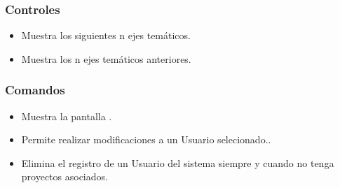 \subsubsection{Controles}
\begin{itemize}
 \item {} Muestra los siguientes n ejes temáticos.
 \item {} Muestra los n ejes temáticos anteriores.
\end{itemize}

\subsubsection{Comandos}
\begin{itemize}
 \item {} Muestra la pantalla .
 \item {} Permite realizar modificaciones a un Usuario selecionado..
 \item {} Elimina el registro de un Usuario del sistema siempre y cuando no tenga proyectos asociados.

\end{itemize}


